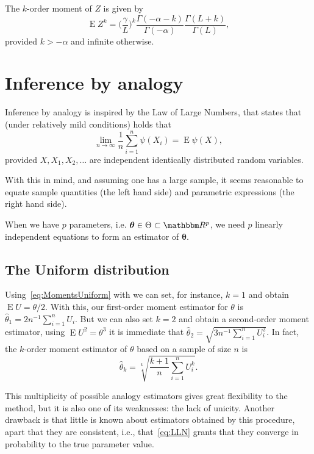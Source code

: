 The $k$-order moment of $Z$ is given by
\begin{equation}
\operatorname{E}Z^k = \Big(\frac{\gamma}{L}\Big)^k
\frac{\Gamma(-\alpha-k)}{\Gamma(-\alpha)}
\frac{\Gamma(L+k)}{\Gamma(L)},
\end{equation}
provided $k>-\alpha$ and infinite otherwise.

\section{Inference by analogy}

Inference by analogy\cite{manski_analog} is inspired by the Law of Large Numbers, that states that (under relatively mild conditions) holds that
\begin{equation}
\lim_{n\to\infty}\frac1n\sum_{i=1}^{n} \psi(X_i) = 
\operatorname{E}\psi(X),
\label{eq:LLN}
\end{equation}
provided $X,X_1,X_2,\dots$ are independent identically distributed random variables.

With this in mind, and assuming one has a large sample, it seems reasonable to equate sample quantities (the left hand side) and parametric expressions (the right hand side).

When we have $p$ parameters, i.e. $\bm \theta\in\Theta\subset\mathbbm R^p$, we need $p$ linearly independent equations to form an estimator of $\bm \theta$.

\subsection{The Uniform distribution}

Using~\eqref{eq:MomentsUniform} with we can set, for instance, $k=1$ and obtain $\operatorname{E}U=\theta/2$.
With this, our first-order moment estimator for $\theta$ is $\widehat{\theta}_1=2n^{-1}\sum_{i=1}^n U_i$.
But we can also set $k=2$ and obtain a second-order moment estimator, using $\operatorname{E}U^2=\theta^3$ it is immediate that
$\widehat{\theta}_2=\sqrt{3n^{-1}\sum_{i=1}^{n} U_i^2}$.
In fact, the $k$-order moment estimator of $\theta$ based on a sample of size $n$ is
\begin{equation}
\widehat{\theta}_k = \sqrt[k]{\frac{k+1}{n} \sum_{i=1}^{n} U_i^k}.
\end{equation}

This multiplicity of possible analogy estimators gives great flexibility to the method, but it is also one of its weaknesses: the lack of unicity.
Another drawback is that little is known about estimators obtained by this procedure, apart that they are consistent, i.e., that~\eqref{eq:LLN} grants that they converge in probability to the true parameter value.

